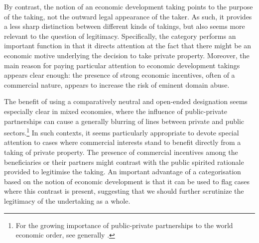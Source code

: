 By contrast, the notion of an economic development taking points to the purpose of the taking, not the outward legal appearance of the taker. As such, it provides a less sharp distinction between different kinds of takings, but also seems more relevant to the question of legitimacy. Specifically, the category performs an important function in that it directs attention at the fact that there might be an economic motive underlying the decision to take private property. Moreover, the main reason for paying particular attention to economic development takings appears clear enough: the presence of strong economic incentives, often of a commercial nature, appears to increase the risk of eminent domain abuse.

The benefit of using a comparatively neutral and open-ended designation seems especially clear in mixed economies, where the influence of public-private partnerships can cause a generally blurring of lines between private and public sectors.\footnote{For the growing importance of public-private partnerships to the world economic order, see generally \cite{saussier13}.} In such contexts, it seems particularly appropriate to devote special attention to cases where commercial interests stand to benefit directly from a taking of private property. The presence of commercial incentives among the beneficiaries or their partners might contrast with the public spirited rationale provided to legitimise the taking. An important advantage of a categorisation based on the notion of economic development is that it can be used to flag cases where this contrast is present, suggesting that we should further scrutinize the legitimacy of the undertaking as a whole.


